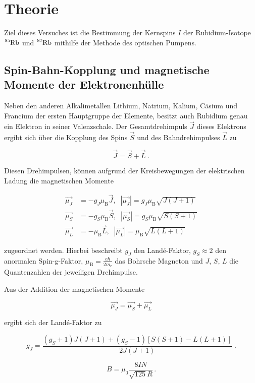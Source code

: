 \section{Theorie}
\label{sec:Theorie}

Ziel dieses Versuches ist die Bestimmung der Kernspins $I$ der Rubidium-Isotope $\ce{^{85}Rb}$ und $\ce{^{87}Rb}$
mithilfe der Methode des optischen Pumpens.

\subsection{Spin-Bahn-Kopplung und magnetische Momente der Elektronenhülle}

Neben den anderen Alkalimetallen Lithium, Natrium, Kalium, Cäsium und Francium der ersten Hauptgruppe der Elemente,
besitzt auch Rubidium genau ein Elektron in seiner Valenzschale.
Der Gesamtdrehimpuls $\vec{J}$ dieses Elektrons ergibt sich über die Kopplung des Spins $\vec{S}$ und des Bahndrehimpulses
$\vec{L}$ zu

\begin{equation}
    \vec{J} = \vec{S} + \vec{L} \; .
\end{equation}

Diesen Drehimpulsen, können aufgrund der Kreisbewegungen der elektrischen Ladung die magnetischen Momente

\begin{align}
    \vec{\mu_J} &= - g_J \mu_\text{B} \vec{J}, \; \; |\vec{\mu_J}| = g_J \mu_\text{B} \sqrt{J(J+1)} \\
    \vec{\mu_S} &= - g_S \mu_\text{B} \vec{S}, \; \; |\vec{\mu_S}| = g_S \mu_\text{B} \sqrt{S(S+1)} \\
    \vec{\mu_L} &= - \mu_\text{B} \vec{L}, \; \; |\vec{\mu_L}| = \mu_\text{B} \sqrt{L(L+1)}
\end{align}

zugeordnet werden. Hierbei beschreibt $g_J$ den Land\'{e}-Faktor, $g_S\approx 2$ den anormalen Spin-g-Faktor, 
$\mu_\text{B} = \frac{e \hbar}{2 m_\text{e}}$ das
Bohrsche Magneton und $J$, $S$, $L$ die Quantenzahlen der jeweiligen Drehimpulse.

Aus der Addition der magnetischen Momente

\begin{equation}
    \vec{\mu_J} = \vec{\mu_S} + \vec{\mu_L}
\end{equation}

ergibt sich der Land\'{e}-Faktor zu

\begin{equation}
    g_J = \frac{(g_S + 1)J(J+1)+(g_S - 1)[S(S+1)-L(L+1)]}{2J(J+1)} \; .
\end{equation}

\begin{equation}
    B = \mu_0 \frac{8IN}{\sqrt{125}R}\,.
    \label{eqn:helm}
\end{equation}
